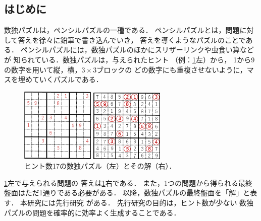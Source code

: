 \documentclass[a4paper, 9pt]{jarticle}
\begin{document}
\small

\twocolumn[\vspace*{29mm}] %
\begin{論文概要}           %

\section{はじめに}
数独パズルは，ペンシルパズルの一種である．
ペンシルパズルとは，問題に対して答えを徐々に鉛筆で書き込んでいき，
答えを導くようなパズルのことである．
ペンシルパズルには，数独パズルのほかにスリザーリンクや虫食い算などが
知られている．数独パズルは，与えられたヒント
（例：\figurename{\ref{fig:problem_and_answer}}左）から，
1から9の数字を用いて縦，横，$3 \times 3$ブロックの
どの数字にも重複させないように，マスを埋めていくパズルである．
\begin{figure}[b]
  \begin{minipage}[b]{0.49\linewidth}
    \centering
    \includegraphics[width=3.5cm]{prob.png}
  \end{minipage}
  \begin{minipage}[b]{0.49\linewidth}
    \centering
    \includegraphics[width=3.5cm]{ans.png}
  \end{minipage}
  \caption{ヒント数17の数独パズル（左）とその解（右）．}
  \label{fig:problem_and_answer}
\end{figure}
\figurename{\ref{fig:problem_and_answer}}左で与えられる問題の
答えは\figurename{\ref{fig:problem_and_answer}}右である．
また，1つの問題から得られる最終盤面はただ1通りである必要がある．
以降，数独パズルの最終盤面を「解」と表す．
本研究には先行研究 \cite{previous_research} がある．
先行研究の目的は，ヒント数が少ない
数独パズルの問題を確率的に効率よく生成することである．

\end{論文概要}
\end{document}
